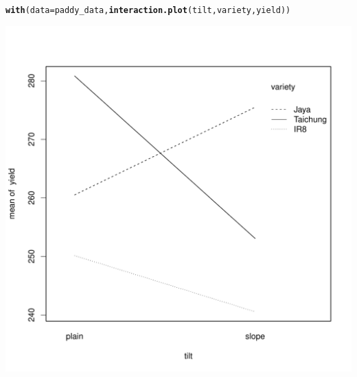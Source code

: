 \documentclass[11pt, a4paper]{article}\usepackage[]{graphicx}\usepackage[dvipsnames]{xcolor}
\makeatletter
\def\maxwidth{ %
  \ifdim\Gin@nat@width>\linewidth
    \linewidth
  \else
    \Gin@nat@width
  \fi
}
\newcommand{\hlstd}[1]{\textcolor[rgb]{0.345,0.345,0.345}{#1}}%
\newcommand{\hlkwc}[1]{\textcolor[rgb]{0.333,0.667,0.333}{#1}}%
\newcommand{\hlkwd}[1]{\textcolor[rgb]{0.737,0.353,0.396}{\textbf{#1}}}%
\newenvironment{kframe}{%
 \def\at@end@of@kframe{}%
 \ifinner\ifhmode%
  \def\at@end@of@kframe{\end{minipage}}%
  \begin{minipage}{\columnwidth}%
 \fi\fi%
 \def\FrameCommand##1{\hskip\@totalleftmargin \hskip-\fboxsep
 \colorbox{shadecolor}{##1}\hskip-\fboxsep
     \hskip-\linewidth \hskip-\@totalleftmargin \hskip\columnwidth}%
 \MakeFramed {\advance\hsize-\width
   \@totalleftmargin\z@ \linewidth\hsize
   \@setminipage}}%
 {\par\unskip\endMakeFramed%
 \at@end@of@kframe}
\newenvironment{knitrout}{}{} %
\makeatother
\begin{document}
\begin{knitrout}
\color{fgcolor}\begin{kframe}
\begin{alltt}
\hlkwd{with}\hlstd{(}\hlkwc{data} \hlstd{= paddy_data,} \hlkwd{interaction.plot}\hlstd{(tilt, variety, yield))}
\end{alltt}
\end{kframe}
\includegraphics[width=\maxwidth]{figure/unnamed-chunk-18-1} 
\end{knitrout}

\newpage
\end{document}

